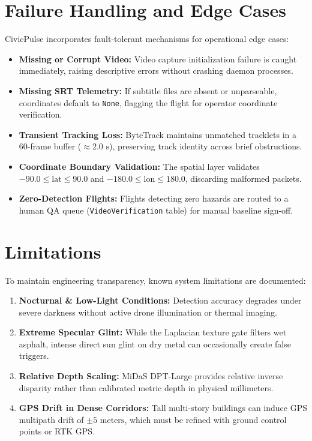 \documentclass[11pt,a4paper]{article}
\begin{document}
\section{Failure Handling and Edge Cases}
CivicPulse incorporates fault-tolerant mechanisms for operational edge cases:
\begin{itemize}[leftmargin=*]
    \item \textbf{Missing or Corrupt Video:} Video capture initialization failure is caught immediately, raising descriptive errors without crashing daemon processes.
    \item \textbf{Missing SRT Telemetry:} If subtitle files are absent or unparseable, coordinates default to \texttt{None}, flagging the flight for operator coordinate verification.
    \item \textbf{Transient Tracking Loss:} ByteTrack maintains unmatched tracklets in a 60-frame buffer ($\approx 2.0\text{ s}$), preserving track identity across brief obstructions.
    \item \textbf{Coordinate Boundary Validation:} The spatial layer validates $-90.0 \le \text{lat} \le 90.0$ and $-180.0 \le \text{lon} \le 180.0$, discarding malformed packets.
    \item \textbf{Zero-Detection Flights:} Flights detecting zero hazards are routed to a human QA queue (\texttt{VideoVerification} table) for manual baseline sign-off.
\end{itemize}

\section{Limitations}
To maintain engineering transparency, known system limitations are documented:
\begin{enumerate}[leftmargin=*]
    \item \textbf{Nocturnal \& Low-Light Conditions:} Detection accuracy degrades under severe darkness without active drone illumination or thermal imaging.
    \item \textbf{Extreme Specular Glint:} While the Laplacian texture gate filters wet asphalt, intense direct sun glint on dry metal can occasionally create false triggers.
    \item \textbf{Relative Depth Scaling:} MiDaS DPT-Large provides relative inverse disparity rather than calibrated metric depth in physical millimeters.
    \item \textbf{GPS Drift in Dense Corridors:} Tall multi-story buildings can induce GPS multipath drift of $\pm 5\text{ meters}$, which must be refined with ground control points or RTK GPS.
\end{enumerate}
\end{document}
